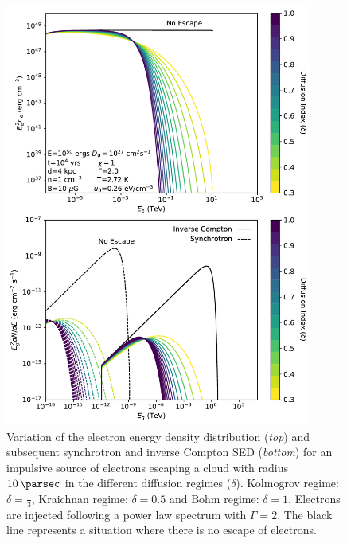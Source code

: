 \begin{figure}[hbtp]
    \centering
    \includegraphics[width=0.9\textwidth]{07_Particle_Evolution/Images/Code/diffusion_regimes_impulsive.pdf}
    \caption{Variation of the electron energy density distribution (\textit{top}) and subsequent synchrotron and inverse Compton SED (\textit{bottom}) for an impulsive source of electrons escaping a cloud with radius $10\,\pc$ in the different diffusion regimes ($\delta$). Kolmogrov regime: $\delta=\frac{1}{3}$, Kraichnan regime: $\delta=0.5$ and Bohm regime: $\delta=1$. Electrons are injected following a power law spectrum with $\Gamma=2$. The black line represents a situation where there is no escape of electrons.}
    \label{fig:chapter_7_newsedprod_diffusion_regimes_impulsive}
\end{figure}

